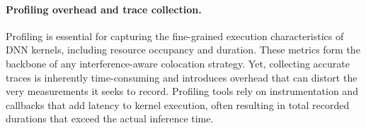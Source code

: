 \paragraph{Profiling overhead and trace collection.}
Profiling is essential for capturing the fine-grained execution characteristics of DNN kernels, including resource occupancy and duration. These metrics form the backbone of any interference-aware colocation strategy. Yet, collecting accurate traces is inherently time-consuming and introduces overhead that can distort the very measurements it seeks to record. Profiling tools rely on instrumentation and callbacks that add latency to kernel execution, often resulting in total recorded durations that exceed the actual inference time.
